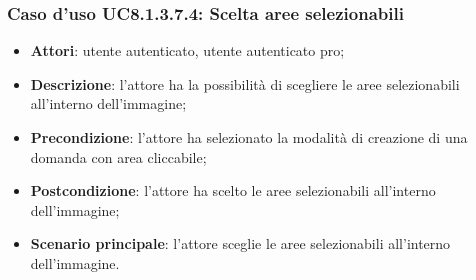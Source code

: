 \subsubsection{Caso d'uso UC8.1.3.7.4: Scelta aree selezionabili}
\begin{itemize}
	\item \textbf{Attori}: utente autenticato, utente autenticato pro;
	\item \textbf{Descrizione}: l'attore ha la possibilità di scegliere le aree selezionabili all'interno dell'immagine;
	\item \textbf{Precondizione}: l'attore ha selezionato la modalità di creazione di una domanda con area cliccabile; 
	\item \textbf{Postcondizione}: l'attore ha scelto le aree selezionabili all'interno dell'immagine;
	\item \textbf{Scenario principale}: l'attore sceglie le aree selezionabili all'interno dell'immagine. 	
\end{itemize}

